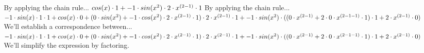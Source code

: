 \documentclass[a4paper, 12pt]{article}
\begin{document}
By applying the chain rule...\newline
$ cos( x )  \cdot 1 + -1 \cdot  sin(  { x } ^ {\small 2 }  )  \cdot 2 \cdot  { x } ^ {\small  ( 2 - 1 )  }  \cdot 1$\newline
By applying the chain rule...\newline
$-1 \cdot  sin( x )  \cdot 1 \cdot 1 +  cos( x )  \cdot 0 +  ( 0 \cdot  sin(  { x } ^ {\small 2 }  )  + -1 \cdot  cos(  { x } ^ {\small 2 }  )  \cdot 2 \cdot  { x } ^ {\small  ( 2 - 1 )  }  \cdot 1 )  \cdot 2 \cdot  { x } ^ {\small  ( 2 - 1 )  }  \cdot 1 + -1 \cdot  sin(  { x } ^ {\small 2 }  )  \cdot  (  ( 0 \cdot  { x } ^ {\small  ( 2 - 1 )  }  + 2 \cdot 0 \cdot  { x } ^ {\small  ( 2 - 1 - 1 )  }  \cdot 1 )  \cdot 1 + 2 \cdot  { x } ^ {\small  ( 2 - 1 )  }  \cdot 0 ) $\newline
We'll establish a correspondence between...\newline
$-1 \cdot  sin( x )  \cdot 1 \cdot 1 +  cos( x )  \cdot 0 +  ( 0 \cdot  sin(  { x } ^ {\small 2 }  )  + -1 \cdot  cos(  { x } ^ {\small 2 }  )  \cdot 2 \cdot  { x } ^ {\small  ( 2 - 1 )  }  \cdot 1 )  \cdot 2 \cdot  { x } ^ {\small  ( 2 - 1 )  }  \cdot 1 + -1 \cdot  sin(  { x } ^ {\small 2 }  )  \cdot  (  ( 0 \cdot  { x } ^ {\small  ( 2 - 1 )  }  + 2 \cdot 0 \cdot  { x } ^ {\small  ( 2 - 1 - 1 )  }  \cdot 1 )  \cdot 1 + 2 \cdot  { x } ^ {\small  ( 2 - 1 )  }  \cdot 0 ) $\newline
We'll simplify the expression by factoring.\newline
\end{document}
